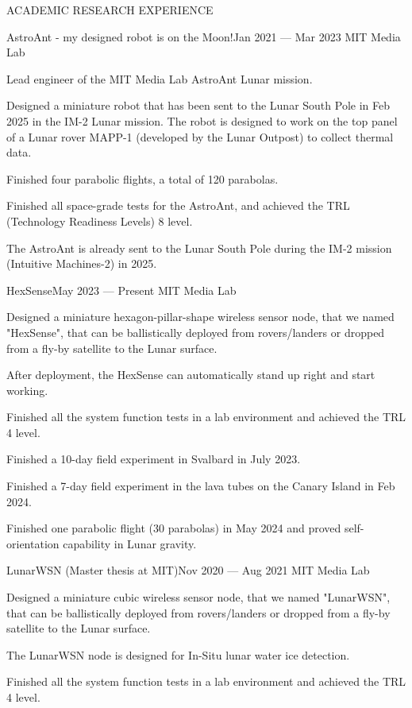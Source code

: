 \documentclass{resume} %
\begin{document}
\begin{rSection}{ACADEMIC RESEARCH EXPERIENCE}
\begin{rSubsection}{AstroAnt - my designed robot is on the Moon!}{Jan 2021 --- Mar 2023}{ }{MIT Media Lab}
    \item Lead engineer of the MIT Media Lab AstroAnt Lunar mission.
    \item Designed a miniature robot that has been sent to the Lunar South Pole in Feb 2025 in the IM-2 Lunar mission.
          The robot is designed to work on the top panel of a Lunar rover MAPP-1 (developed by the Lunar Outpost)
          to collect thermal data.
    \item Finished four parabolic flights, a total of 120 parabolas.
    \item Finished all space-grade tests for the AstroAnt, and achieved the TRL (Technology Readiness Levels) 8 level.
    \item The AstroAnt is already sent to the Lunar South Pole during the IM-2 mission (Intuitive Machines-2) in 2025.
\end{rSubsection}

\begin{rSubsection}{HexSense}{May 2023 --- Present}{ }{MIT Media Lab}
\item Designed a miniature hexagon-pillar-shape wireless sensor node, that we named "HexSense",
      that can be ballistically deployed from rovers/landers or dropped from a fly-by satellite to the Lunar surface.
\item After deployment, the HexSense can automatically stand up right and start working.
\item Finished all the system function tests in a lab environment and achieved the TRL 4 level.
\item Finished a 10-day field experiment in Svalbard in July 2023.
\item Finished a 7-day field experiment in the lava tubes on the Canary Island in Feb 2024.
\item Finished one parabolic flight (30 parabolas) in May 2024 and proved self-orientation capability in Lunar gravity.
\end{rSubsection}

\begin{rSubsection}{LunarWSN (Master thesis at MIT)}{Nov 2020 --- Aug 2021}{ }{MIT Media Lab}
\item Designed a miniature cubic wireless sensor node, that we named "LunarWSN",
      that can be ballistically deployed from rovers/landers or dropped from a fly-by satellite to the Lunar surface.
\item The LunarWSN node is designed for In-Situ lunar water ice detection.
\item Finished all the system function tests in a lab environment and achieved the TRL 4 level.
\end{rSubsection}


\end{rSection}
\end{document}
